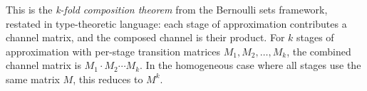 \documentclass[ ../main.tex]{subfiles}
\begin{document}
This is the \emph{k-fold composition theorem} from the Bernoulli sets framework, restated in type-theoretic language: each stage of approximation contributes a channel matrix, and the composed channel is their product.
For $k$ stages of approximation with per-stage transition matrices $M_1, M_2, \ldots, M_k$, the combined channel matrix is $M_1 \cdot M_2 \cdots M_k$.
In the homogeneous case where all stages use the same matrix $M$, this reduces to $M^k$.
\end{document}

